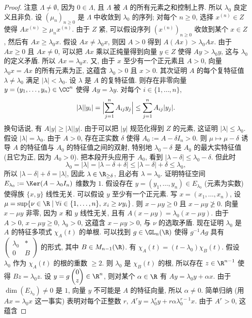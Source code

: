 \begin{proof}
注意 $\Lambda \neq \emptyset$, 因为 $0 \in \Lambda$, 且 $\Lambda$ 被 $A$ 的所有元素之和控制上界. 所以 $\lambda_0$ 良定义且非负. 设 $(\mu_n)_{n \geq 0}$ 是 $\Lambda$ 中收敛到 $\lambda_0$ 的序列; 对每个 $n \geq 0$, 选择 $x^{(n)} \in Z$ 使得 $Ax^{(n)} \geq \mu_nx^{(n)}$. 由于 $Z$ 紧, 可以假设序列 $(x^{(n)})_{n \geq 0}$ 收敛到某个 $x \in Z$, 然后有 $Ax \geq \lambda_0x$. 假设 $Ax \neq \lambda_0x$, 则因 $A > 0$ 得到 $A(Ax) > \lambda_0Ax$. 由于 $Ax \geq 0$ 且 $Ax \neq 0$, 可以把 $Ax$ 乘以正纯量得到向量 $y \in Z$ 使得 $Ay > \lambda_0y$, 这与 $\lambda_0$ 的定义矛盾. 所以 $Ax = \lambda_0x$. 又, 由于 $x$ 至少有一个正元素且 $A > 0$, 向量 $\lambda_0x = Ax$ 的所有元素为正, 这蕴含 $\lambda_0 > 0$ 且 $x > 0$.
其次证明 $A$ 的每个复特征值 $\lambda \neq \lambda_0$ 满足 $|\lambda| < \lambda_0$. 设 $\lambda$ 是 $A$ 的复特征值. 则存在非零向量 $y = (y_1, \ldots, y_n) \in \CC^n$ 使得 $Ay = \lambda y$. 对每个 $i \in \{1, \ldots, n\}$,
\[
|\lambda||y_i| = \Bigl|\sum_{j=1}^n A_{ij}y_j\Bigr| \leq \sum_{j=1}^n A_{ij}|y_j|.
\]
换句话说, 有 $A|y| \geq |\lambda||y|$. 由于可以把 $|y|$ 规范化得到 $Z$ 的元素, 这证明 $|\lambda| \leq \lambda_0$. 假设 $|\lambda| = \lambda_0$. 由于 $A > 0$, 存在正实数 $\delta$ 使得 $A_0 := A - \delta I_n > 0$. 则 $\mu \longmapsto \mu - \delta$ 诱导 $A$ 的特征值与 $A_0$ 的特征值之间的双射, 特别地 $\lambda_0 - \delta$ 是 $A_0$ 的最大实特征值 (且它为正, 因为 $A_0 > 0$). 把本段开头应用于 $A_0$, 看到 $|\lambda - \delta| \leq \lambda_0 - \delta$. 但此时
\[
\lambda_0 = |\lambda| = |\lambda - \delta + \delta| \leq |\lambda - \delta| + \delta \leq \lambda_0,
\]
所以 $|\lambda - \delta| + \delta = |\lambda|$, 因此 $\lambda \in \R_{\geq \delta}$, 且必有 $\lambda = \lambda_0$.
证明特征空间 $E_{\lambda_0} := \Ker(A - \lambda_0I_n)$ 维数为 $1$. 假设存在 $y = (y_1, \ldots, y_n) \in E_{\lambda_0}$ (元素为实数) 使得族 $\{x, y\}$ 线性无关. 可以假设 $y$ 至少有一个正元素. 写 $x = (x_1, \ldots, x_n)$, 设 $\mu = \sup\{\nu \in \R \mid \forall i \in \{1, \ldots, n\},\, x_i \geq \nu y_i\}$. 则 $x - \mu y \geq 0$ 且 $x - \mu y \ngeq 0$. 向量 $x - \mu y$ 非零, 因为 $x$ 和 $y$ 线性无关, 且有 $A(x - \mu y) = \lambda_0(x - \mu y)$. 由于 $A > 0$, $x - \mu y \geq 0$, $\lambda_0 > 0$, 这蕴含 $x - \mu y > 0$, 与 $\nu$ 的选取矛盾.
现在证明 $\lambda_0$ 是 $A$ 的特征多项式 $\chi_A(t)$ 的单根. 可以找到 $g \in \GL_n(\R)$ 使得 $g^{-1}Ag$ 具有 $\begin{pmatrix} \lambda_0 & * \\ 0 & B \end{pmatrix}$ 的形式, 其中 $B \in M_{n-1}(\R)$. 有 $\chi_A(t) = (t - \lambda_0)\chi_B(t)$. 假设 $\lambda_0$ 作为 $\chi_A(t)$ 的根的重数 $\geq 2$. 则 $\lambda_0$ 是 $\chi_B(t)$ 的根, 所以存在 $z \in \R^{n-1}$ 使得 $Bz = \lambda_0z$. 设 $y = g\begin{pmatrix} 0 \\ z \end{pmatrix} \in \R^n$, 则对某个 $\alpha \in \R$ 有 $Ay = \lambda_0y + \alpha x$. 由于 $\dim(E_{\lambda_0}) \neq 0$ 是 $1$, 向量 $y$ 不可能是 $A$ 的特征向量, 所以 $\alpha \neq 0$. 简单归纳 (用 $Ax = \lambda_0x$ 这一事实) 表明对每个正整数 $r$, $A^ry = \lambda_0^ry + r\alpha\lambda_0^{r-1}x$. 由于 $A^r > 0$, 这蕴含

\end{proof}
